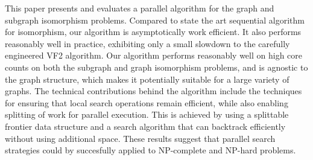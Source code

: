 This paper presents and evaluates a parallel algorithm for the graph
and subgraph isomorphism problems.
%
Compared to state the art sequential algorithm for isomorphism, our
algorithm is asymptotically work efficient.
%
It also performs reasonably well in practice, exhibiting only a small
slowdown to the carefully engineered VF2 algorithm.
%
Our algorithm performs reasonably well on high core counts on both the subgraph
and graph isomorphism problems, and is agnostic to the graph
structure, which makes it potentially suitable for a large variety of
graphs.
%
The technical contributions behind the algorithm include the
techniques for ensuring that local search operations remain efficient,
while also enabling splitting of work for parallel execution.
%
This is achieved by using a splittable frontier data structure and a
search algorithm that can backtrack efficiently without using
additional space.
%
These results suggest that parallel search strategies could by
succesfully applied to NP-complete and NP-hard  problems.










% 

\newpage
% 

